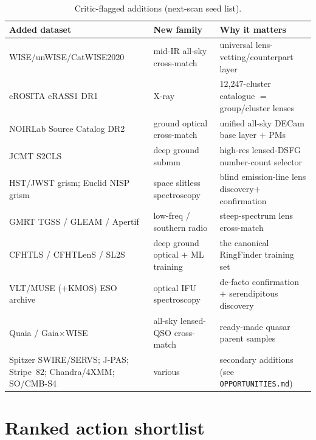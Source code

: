 \documentclass[11pt,letterpaper]{article}
\begin{document}
\begin{table}[h]
\centering\footnotesize
\caption{Critic-flagged additions (next-scan seed list).}\label{tab:critic}
\begin{tabular}{@{}lll@{}}
\toprule
Added dataset & New family & Why it matters \\ \midrule
WISE/unWISE/CatWISE2020 \citep{marocco2021catwise} & mid-IR all-sky cross-match & universal lens-vetting/counterpart layer \\
eROSITA eRASS1 DR1 \citep{merloni2024erass1} & X-ray & 12{,}247-cluster catalogue $=$ group/cluster lenses \\
NOIRLab Source Catalog DR2 \citep{nidever2021nsc} & ground optical cross-match & unified all-sky DECam base layer $+$ PMs \\
JCMT S2CLS \citep{geach2017s2cls} & deep ground submm & high-res lensed-DSFG number-count selector \\
HST/JWST grism; Euclid NISP grism & space slitless spectroscopy & blind emission-line lens discovery$+$confirmation \\
GMRT TGSS / GLEAM / Apertif & low-freq / southern radio & steep-spectrum lens cross-match \\
CFHTLS / CFHTLenS / SL2S & deep ground optical $+$ ML training & the canonical RingFinder training set \\
VLT/MUSE ($+$KMOS) ESO archive & optical IFU spectroscopy & de-facto confirmation $+$ serendipitous discovery \\
Quaia / Gaia$\times$WISE \citep{storeyfisher2024quaia} & all-sky lensed-QSO cross-match & ready-made quasar parent samples \\
Spitzer SWIRE/SERVS; J-PAS; Stripe~82; Chandra/4XMM; SO/CMB-S4 & various & secondary additions (see \texttt{OPPORTUNITIES.md}) \\
\bottomrule
\end{tabular}
\end{table}

\section{Ranked action shortlist}
\end{document}

